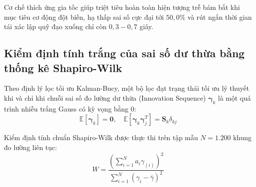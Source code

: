 Cơ chế thích ứng gia tốc giúp triệt tiêu hoàn toàn hiện tượng trễ bám bắt khi mục tiêu cơ động đột biến, hạ thấp sai số cực đại tới $50{,}0\%$ và rút ngắn thời gian tái xác lập quỹ đạo xuống chỉ còn $0{,}3 - 0{,}7$ giây.

\subsection{Kiểm định tính trắng của sai số dư thừa bằng thống kê Shapiro-Wilk}

\hspace{0.5cm} Theo định lý lọc tối ưu Kalman-Bucy, một bộ lọc đạt trạng thái tối ưu lý thuyết khi và chỉ khi chuỗi sai số đo lường dư thừa (Innovation Sequence) $\boldsymbol{\gamma}_k$ là một quá trình nhiễu trắng Gauss có kỳ vọng bằng 0:
\begin{equation}
\mathbb{E}[\boldsymbol{\gamma}_k] = \mathbf{0}, \quad \mathbb{E}[\boldsymbol{\gamma}_k \boldsymbol{\gamma}_j^T] = \mathbf{S}_k \delta_{kj}
\label{eq:whiteness-innovation-property}
\end{equation}

Kiểm định tính chuẩn Shapiro-Wilk được thực thi trên tập mẫu $N = 1.200$ khung đo lường liên tục:
\begin{equation}
W = \frac{\left( \sum_{i=1}^N a_i \gamma_{(i)} \right)^2}{\sum_{i=1}^N (\gamma_i - \bar{\gamma})^2}
\label{eq:shapiro-wilk-w-statistic}
\end{equation}

\begin{table}[H]
\centering
\caption{Kết quả kiểm định tính chuẩn Shapiro-Wilk của chuỗi Innovation trên các kịch bản mục tiêu}
\label{tab:shapiro-wilk-normality-results}
\end{table}


